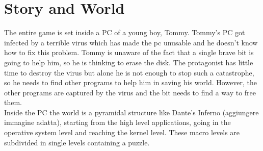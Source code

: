 \documentclass[12pt, a4paper]{report}
\begin{document}
\chapter{Story and World}
The entire game is set inside a PC of a young boy, Tommy. Tommy’s PC got infected by a terrible virus which has made the pc unusable and he doesn’t know how to fix this problem. Tommy is unaware of the fact that a single brave bit is going to help him, so he is thinking to erase the disk. The protagonist has little time to destroy the virus but alone he is not enough to stop such a catastrophe, so he needs to find other programs to help him in saving his world. However, the other programs are captured by the virus and the bit needs to find a way to free them.\\
Inside the PC the world is a pyramidal structure like Dante’s Inferno (aggiungere immagine adatta), starting from the high level applications, going in the operative system level and reaching the kernel level. These macro levels are subdivided in single levels containing a puzzle.
\end{document}
